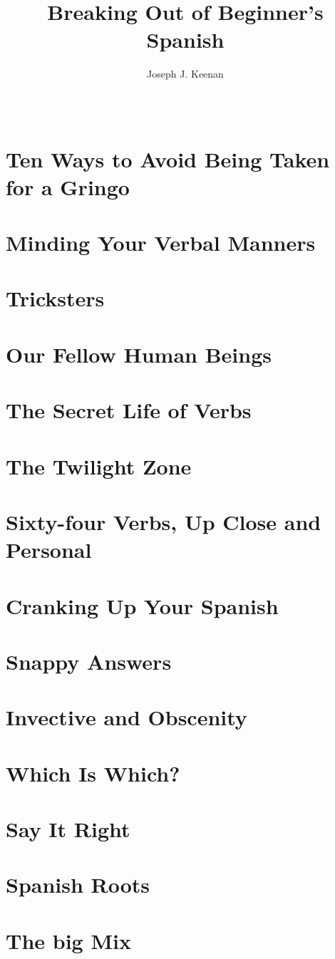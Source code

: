 
\usepackage[hidelinks]{hyperref}



\frontmatter

\begin{titlingpage}
\title{Breaking Out of Beginner's Spanish}
\author{Joseph J. Keenan}
\date{~}
\maketitle
\end{titlingpage}

\tableofcontents*

\mainmatter

\chapter{Ten Ways to Avoid Being Taken for a Gringo}
\chapter{Minding Your Verbal Manners}
\chapter{Tricksters}
\chapter{Our Fellow Human Beings}
\chapter{The Secret Life of Verbs}
\chapter{The Twilight Zone}
\chapter{Sixty-four Verbs, Up Close and Personal}
\chapter{Cranking Up Your Spanish}
\chapter{Snappy Answers}
\chapter{Invective and Obscenity}
\chapter{Which Is Which?}
\chapter{Say It Right}
\chapter{Spanish Roots}
\chapter{The big Mix}


